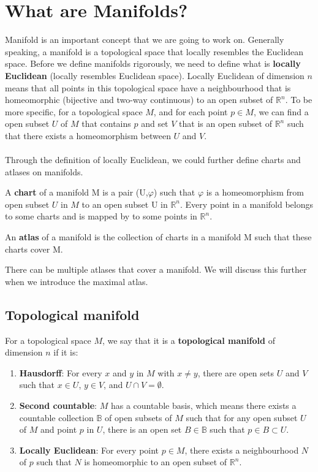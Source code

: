 \documentclass[12pt,twoside]{article}
\newcommand{\rn}{$\mathbb{R}^n$}
\begin{document}
\section{What are Manifolds?}

Manifold is an important concept that we are going to work on. Generally speaking, a manifold is a topological space that locally resembles the Euclidean space. Before we define manifolds rigorously, we need to define what is {\bf locally Euclidean} (locally resembles Euclidean space). Locally Euclidean of dimension $n$ means that all points in this topological space have a neighbourhood that is homeomorphic (bijective and two-way continuous) to an open subset of $\mathbb{R}^n$. To be more specific, for a topological space $M$, and for each point $p\in M$, we can find a open subset $U$ of $M$ that contains $p$ and set $V$ that is an open subset of $\mathbb{R}^n$  such that there exists a homeomorphism between $U$ and $V$.\\
\\
Through the definition of locally Euclidean, we could further define charts and atlases on manifolds.
\begin{definition}
A {\bf chart} of a manifold M is a pair (U,$\varphi$) such that $\varphi$ is a homeomorphism from open subset $U$ in $M$ to an open subset U in \rn. Every point in a manifold belongs to some charts and is mapped by to some points in \rn.
\\
\end{definition}

\begin{definition}
An {\bf atlas} of a manifold is the collection of charts in a manifold M such that these charts cover M. \\
\end{definition}

There can be multiple atlases that cover a manifold. We will discuss this further when we introduce the maximal atlas.
\subsection{Topological manifold}
\begin{definition}
For a topological space $M$, we say that it is a \textbf{topological manifold} of dimension $n$ if it is: \cite{GTM}
\begin{enumerate}
    \item {\bf Hausdorff}: For every $x$ and $y$ in $M$ with $x \neq y$, there are open sets $U$ and $V$ such that $x \in U$, $y \in V$, and $U \cap V=\emptyset$.
    \item {\bf Second countable}: $M$ has a countable basis, which means there exists a countable collection $\mathbb{B}$ of open subsets of $M$ such that for any open subset $U$ of $M$ and point $p$ in $U$, there is an open set $B \in \mathbb{B}$ such that $p \in B \subset U$.
    \item {\bf Locally Euclidean}: For every point $p\in M$, there exists a neighbourhood $N$ of $p$ such that $N$ is homeomorphic to an open subset of \rn.
\end{enumerate}
\end{definition} 
\end{document}
